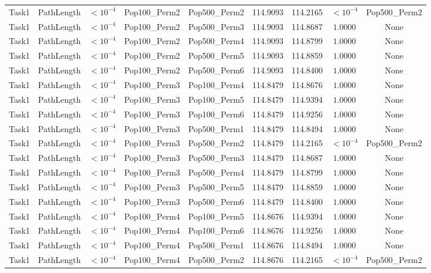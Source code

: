 \documentclass[8pt]{article}
\begin{document}
\begin{longtable}{llccccccc}
Task1 & PathLength & $< 10^{-4}$ & Pop100\_Perm2 & Pop500\_Perm2 & 114.9093 & 114.2165 & $< 10^{-4}$ & Pop500\_Perm2 \\
Task1 & PathLength & $< 10^{-4}$ & Pop100\_Perm2 & Pop500\_Perm3 & 114.9093 & 114.8687 & $1.0000$ & None \\
Task1 & PathLength & $< 10^{-4}$ & Pop100\_Perm2 & Pop500\_Perm4 & 114.9093 & 114.8799 & $1.0000$ & None \\
Task1 & PathLength & $< 10^{-4}$ & Pop100\_Perm2 & Pop500\_Perm5 & 114.9093 & 114.8859 & $1.0000$ & None \\
Task1 & PathLength & $< 10^{-4}$ & Pop100\_Perm2 & Pop500\_Perm6 & 114.9093 & 114.8400 & $1.0000$ & None \\
Task1 & PathLength & $< 10^{-4}$ & Pop100\_Perm3 & Pop100\_Perm4 & 114.8479 & 114.8676 & $1.0000$ & None \\
Task1 & PathLength & $< 10^{-4}$ & Pop100\_Perm3 & Pop100\_Perm5 & 114.8479 & 114.9394 & $1.0000$ & None \\
Task1 & PathLength & $< 10^{-4}$ & Pop100\_Perm3 & Pop100\_Perm6 & 114.8479 & 114.9256 & $1.0000$ & None \\
Task1 & PathLength & $< 10^{-4}$ & Pop100\_Perm3 & Pop500\_Perm1 & 114.8479 & 114.8494 & $1.0000$ & None \\
Task1 & PathLength & $< 10^{-4}$ & Pop100\_Perm3 & Pop500\_Perm2 & 114.8479 & 114.2165 & $< 10^{-4}$ & Pop500\_Perm2 \\
Task1 & PathLength & $< 10^{-4}$ & Pop100\_Perm3 & Pop500\_Perm3 & 114.8479 & 114.8687 & $1.0000$ & None \\
Task1 & PathLength & $< 10^{-4}$ & Pop100\_Perm3 & Pop500\_Perm4 & 114.8479 & 114.8799 & $1.0000$ & None \\
Task1 & PathLength & $< 10^{-4}$ & Pop100\_Perm3 & Pop500\_Perm5 & 114.8479 & 114.8859 & $1.0000$ & None \\
Task1 & PathLength & $< 10^{-4}$ & Pop100\_Perm3 & Pop500\_Perm6 & 114.8479 & 114.8400 & $1.0000$ & None \\
Task1 & PathLength & $< 10^{-4}$ & Pop100\_Perm4 & Pop100\_Perm5 & 114.8676 & 114.9394 & $1.0000$ & None \\
Task1 & PathLength & $< 10^{-4}$ & Pop100\_Perm4 & Pop100\_Perm6 & 114.8676 & 114.9256 & $1.0000$ & None \\
Task1 & PathLength & $< 10^{-4}$ & Pop100\_Perm4 & Pop500\_Perm1 & 114.8676 & 114.8494 & $1.0000$ & None \\
Task1 & PathLength & $< 10^{-4}$ & Pop100\_Perm4 & Pop500\_Perm2 & 114.8676 & 114.2165 & $< 10^{-4}$ & Pop500\_Perm2 \\

\end{longtable}
\end{document}
